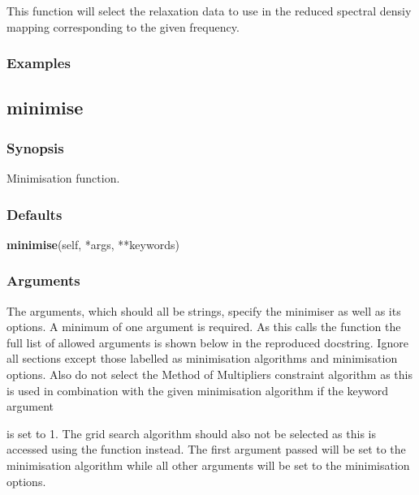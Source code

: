 This function will select the relaxation data to use in the reduced spectral densiy mapping
corresponding to the given frequency.


\subsubsection{Examples}





\newpage

\subsection{minimise}


\subsubsection{Synopsis}

Minimisation function.

\subsubsection{Defaults}

\textsf{\textbf{minimise}(self, *args, **keywords)}


\subsubsection{Arguments}

The arguments, which should all be strings, specify the minimiser as well as its options.  A
minimum of one argument is required.  As this calls the function 
 the full
list of allowed arguments is shown below in the reproduced 
 docstring.
Ignore all sections except those labelled as minimisation algorithms and minimisation
options.  Also do not select the Method of Multipliers constraint algorithm as this is used
in combination with the given minimisation algorithm if the keyword argument 

is set to 1.  The grid search algorithm should also not be selected as this is accessed
using the 
 function instead.  The first argument passed will be set to the
minimisation algorithm while all other arguments will be set to the minimisation options.

